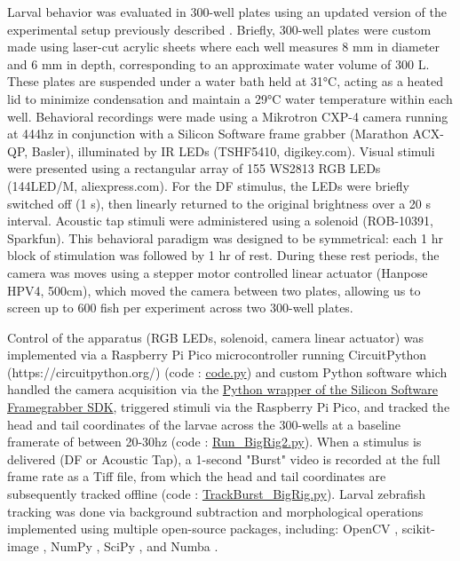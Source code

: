 \documentclass[9pt,lineno]{RandlettLab_elife}
\begin{document}
{Larval behavior was evaluated in 300-well plates using an updated version of the experimental setup previously described \citep{Randlett2019-fj,Lamire2023-he}. 
Briefly, 300-well plates were custom made using laser-cut acrylic sheets where each well measures 8 mm in diameter and 6 mm in depth, corresponding to an approximate water volume of 300 \textmu L.
These plates are suspended under a water bath held at 31°C, acting as a heated lid to minimize condensation and maintain a 29°C water temperature within each well. 
Behavioral recordings were made using a Mikrotron CXP-4 camera running at 444hz in conjunction with a Silicon Software frame grabber (Marathon ACX-QP, Basler), illuminated by IR LEDs (TSHF5410, digikey.com). Visual stimuli were presented using a rectangular array of 155 WS2813 RGB LEDs (144LED/M, aliexpress.com). 
For the DF stimulus, the LEDs were briefly switched off (1 s), then linearly returned to the original brightness over a 20 s interval. 
Acoustic tap stimuli were administered using a solenoid (ROB-10391, Sparkfun). 
This behavioral paradigm was designed to be symmetrical: each 1 hr block of stimulation was followed by 1 hr of rest. 
During these rest periods, the camera was moves using a stepper motor controlled linear actuator (Hanpose HPV4, 500cm), which moved the camera between two plates, allowing us to screen up to 600 fish per experiment across two 300-well plates. 

Control of the apparatus (RGB LEDs, solenoid, camera linear actuator) was implemented via a Raspberry Pi Pico microcontroller running  CircuitPython (https://circuitpython.org/) (code : \href{https://github.com/owenrandlett/2025_HabEstrogen/tree/main/code/RigControl/PiPicro}{code.py}) and custom Python software which handled the camera acquisition via the \href{https://docs.baslerweb.com/frame-grabbers/python-wrapper}{Python wrapper of the Silicon Software Framegrabber SDK}, triggered stimuli via the Raspberry Pi Pico, and tracked the head and tail coordinates of the larvae across the 300-wells at a baseline framerate of between 20-30hz  (code : \href{https://github.com/owenrandlett/2025_HabEstrogen/blob/main/code/RigControl/Run_BigRig2.py}{Run\_BigRig2.py}). 
When a stimulus is delivered (DF or Acoustic Tap), a 1-second "Burst" video is recorded at the full frame rate as a Tiff file, from which the head and tail coordinates are subsequently tracked offline (code : \href{https://github.com/owenrandlett/2025_HabEstrogen/blob/main/code/RigControl/TrackBurst_BigRig.py}{TrackBurst\_BigRig.py}).
Larval zebrafish tracking was done via background subtraction and morphological operations implemented using multiple open-source packages, including: 
OpenCV \citep{Bradski2000-qo}, 
scikit-image \citep{van2014scikit}, 
NumPy \citep{Harris2020-bg}, 
SciPy \citep{Virtanen2020-sz}, 
and Numba \citep{lam2015numba}.


}
\end{document}
